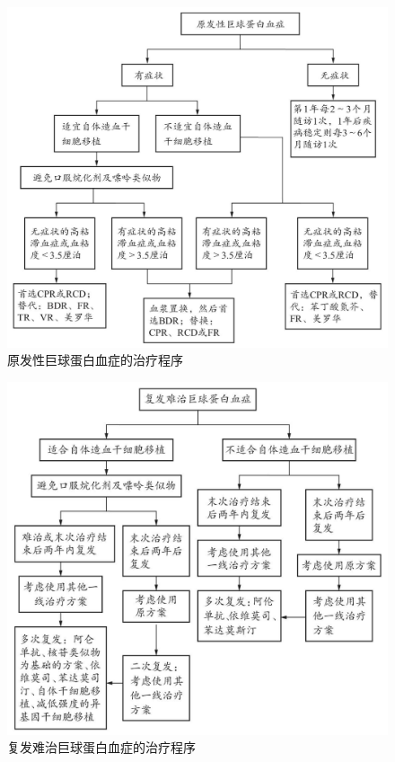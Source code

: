 \begin{figure}[!htbp]
 \centering
 \includegraphics{./images/Image00166.jpg}
 \captionsetup{justification=centering}
 \caption{原发性巨球蛋白血症的治疗程序}
 \label{fig5-4-5}
  \end{figure} 

\begin{figure}[!htbp]
 \centering
 \includegraphics{./images/Image00167.jpg}
 \captionsetup{justification=centering}
 \caption{复发难治巨球蛋白血症的治疗程序}
 \label{fig5-4-6}
  \end{figure} 

